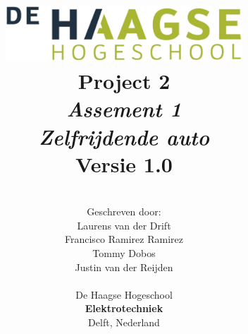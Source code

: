 \title{
\includegraphics[width=3.5in]{Media/Figuren/HHS.png} \\
\vspace*{2in}
\textbf{Project 2}\\
\textit{Assement 1}\\
\textit{Zelfrijdende auto}\\
Versie 1.0
}
\author{
\vspace*{1.5in} \\
  Geschreven door:\\
  Laurens van der Drift\\
  Francisco Ramirez Ramirez\\
  Tommy Dobos\\
  Justin van der Reijden\\
		\vspace*{0.5in} \\
		De Haagse Hogeschool\\
        \textbf{Elektrotechniek}\\
        Delft, Nederland
       } 